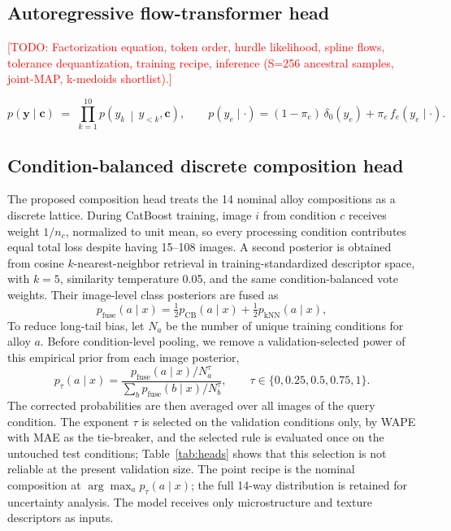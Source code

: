 \documentclass{article}
\newcommand{\todo}[1]{\textcolor{red}{[TODO: #1]}}
\begin{document}
\subsection{Autoregressive flow-transformer head}
\todo{Factorization equation, token order, hurdle likelihood, spline flows,
tolerance dequantization, training recipe, inference (S=256 ancestral samples,
joint-MAP, k-medoids shortlist).}

\begin{equation}
p(\mathbf{y} \mid \mathbf{c}) \;=\; \prod_{k=1}^{10}
p\!\left(y_k \,\middle|\, y_{<k}, \mathbf{c}\right), \qquad
p(y_e \mid \cdot) = (1-\pi_e)\,\delta_0(y_e) + \pi_e\, f_e(y_e \mid \cdot).
\end{equation}

\subsection{Condition-balanced discrete composition head}
The proposed composition head treats the 14 nominal alloy compositions as a
discrete lattice. During CatBoost training, image $i$ from condition $c$
receives weight $1/n_c$, normalized to unit mean, so every processing
condition contributes equal total loss despite having 15--108 images. A
second posterior is obtained from cosine $k$-nearest-neighbor retrieval in
training-standardized descriptor space, with $k=5$, similarity temperature
0.05, and the same condition-balanced vote weights. Their image-level class
posteriors are fused as
\begin{equation}
  p_{\mathrm{fuse}}(a\mid x) = \tfrac{1}{2}p_{\mathrm{CB}}(a\mid x)
  + \tfrac{1}{2}p_{\mathrm{kNN}}(a\mid x),
\end{equation}
To reduce long-tail bias, let $N_a$ be the number of unique training
conditions for alloy $a$. Before condition-level pooling, we remove a
validation-selected power of this empirical prior from each image posterior,
\begin{equation}
  p_{\tau}(a\mid x) =
  \frac{p_{\mathrm{fuse}}(a\mid x) / N_a^{\tau}}
       {\sum_b p_{\mathrm{fuse}}(b\mid x) / N_b^{\tau}},
  \qquad \tau\in\{0,0.25,0.5,0.75,1\}.
\end{equation}
The corrected probabilities are then averaged over all images of the query
condition. The exponent $\tau$ is selected on the validation conditions only,
by WAPE with MAE as the tie-breaker, and the selected rule is evaluated once
on the untouched test conditions; Table~\ref{tab:heads} shows that this
selection is not reliable at the present validation size. The point recipe is
the nominal composition at
$\arg\max_a p_{\tau}(a\mid x)$; the full 14-way distribution is retained for
uncertainty analysis. The model receives only microstructure and texture
descriptors as inputs.
\end{document}
